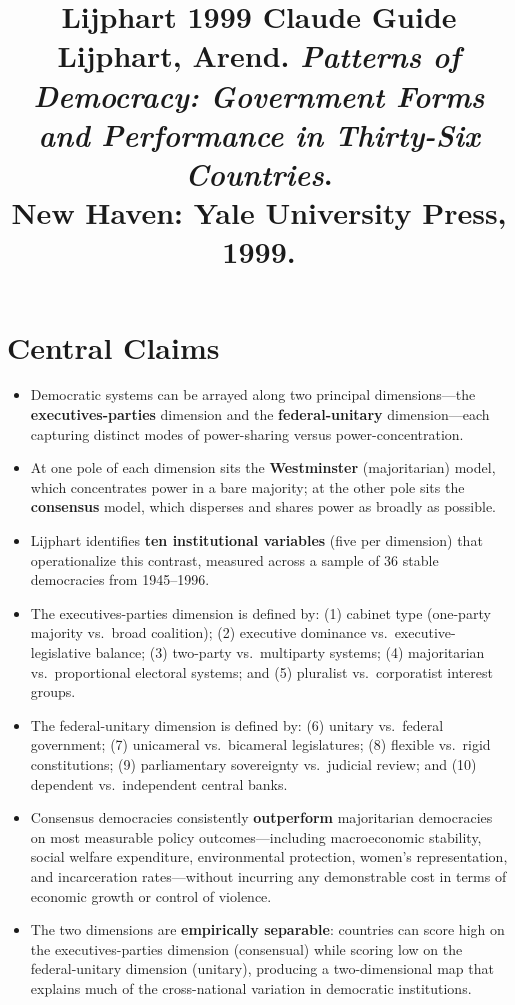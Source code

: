 \documentclass[12pt]{article}
\title{\textbf{Lijphart 1999 Claude Guide}\\
\large Lijphart, Arend. \textit{Patterns of Democracy: Government Forms and Performance in Thirty-Six Countries}.\\
New Haven: Yale University Press, 1999.}
\author{}
\date{}
\begin{document}
\maketitle
\tableofcontents
\newpage

\section{Central Claims}

\begin{itemize}[leftmargin=*, itemsep=4pt]
    \item Democratic systems can be arrayed along two principal dimensions---the \textbf{executives-parties} dimension and the \textbf{federal-unitary} dimension---each capturing distinct modes of power-sharing versus power-concentration.
    \item At one pole of each dimension sits the \textbf{Westminster} (majoritarian) model, which concentrates power in a bare majority; at the other pole sits the \textbf{consensus} model, which disperses and shares power as broadly as possible.
    \item Lijphart identifies \textbf{ten institutional variables} (five per dimension) that operationalize this contrast, measured across a sample of 36 stable democracies from 1945--1996.
    \item The executives-parties dimension is defined by: (1) cabinet type (one-party majority vs.\ broad coalition); (2) executive dominance vs.\ executive-legislative balance; (3) two-party vs.\ multiparty systems; (4) majoritarian vs.\ proportional electoral systems; and (5) pluralist vs.\ corporatist interest groups.
    \item The federal-unitary dimension is defined by: (6) unitary vs.\ federal government; (7) unicameral vs.\ bicameral legislatures; (8) flexible vs.\ rigid constitutions; (9) parliamentary sovereignty vs.\ judicial review; and (10) dependent vs.\ independent central banks.
    \item Consensus democracies consistently \textbf{outperform} majoritarian democracies on most measurable policy outcomes---including macroeconomic stability, social welfare expenditure, environmental protection, women's representation, and incarceration rates---without incurring any demonstrable cost in terms of economic growth or control of violence.
    \item The two dimensions are \textbf{empirically separable}: countries can score high on the executives-parties dimension (consensual) while scoring low on the federal-unitary dimension (unitary), producing a two-dimensional map that explains much of the cross-national variation in democratic institutions.

\end{itemize}
\end{document}

